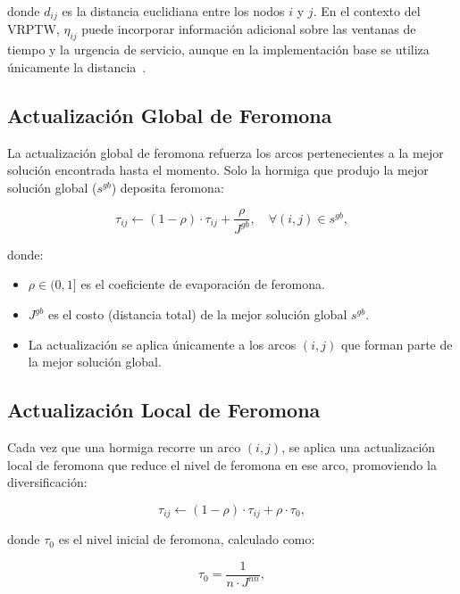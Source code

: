 \documentclass[12pt, letterpaper]{article}
\begin{document}
\noindent donde $d_{ij}$ es la distancia euclidiana entre los nodos $i$ y $j$. En el contexto del VRPTW, $\eta_{ij}$ puede incorporar información adicional sobre las ventanas de tiempo y la urgencia de servicio, aunque en la implementación base se utiliza únicamente la distancia~\cite{gambardella1999}.

\subsection{Actualización Global de Feromona}
\label{subsec:actualizacion_global}

La actualización global de feromona refuerza los arcos pertenecientes a la mejor solución encontrada hasta el momento. Solo la hormiga que produjo la mejor solución global ($s^{gb}$) deposita feromona:

\begin{equation}
  \label{eq:global_update}
  \tau_{ij} \leftarrow (1 - \rho) \cdot \tau_{ij} + \frac{\rho}{J^{gb}},
  \quad \forall (i, j) \in s^{gb},
\end{equation}

\noindent donde:
\begin{itemize}[leftmargin=2cm]
  \item $\rho \in (0, 1]$ es el coeficiente de evaporación de feromona.
  \item $J^{gb}$ es el costo (distancia total) de la mejor solución global $s^{gb}$.
  \item La actualización se aplica únicamente a los arcos $(i, j)$ que forman parte de la mejor solución global.
\end{itemize}

\subsection{Actualización Local de Feromona}
\label{subsec:actualizacion_local}

Cada vez que una hormiga recorre un arco $(i, j)$, se aplica una actualización local de feromona que reduce el nivel de feromona en ese arco, promoviendo la diversificación:

\begin{equation}
  \label{eq:local_update}
  \tau_{ij} \leftarrow (1 - \rho) \cdot \tau_{ij} + \rho \cdot \tau_0,
\end{equation}

\noindent donde $\tau_0$ es el nivel inicial de feromona, calculado como:

\begin{equation}
  \label{eq:tau_0}
  \tau_0 = \frac{1}{n \cdot J^{nn}},
\end{equation}
\end{document}
